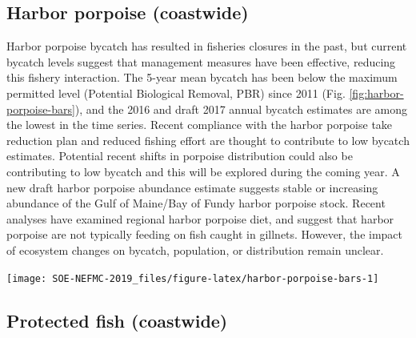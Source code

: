 \documentclass[10pt,]{article}
\let\origfigure\figure
\let\endorigfigure\endfigure
\renewenvironment{figure}[1][2] {
    \expandafter\origfigure\expandafter[H]
} {
    \endorigfigure
}
\begin{document}
\subsection{Harbor porpoise
(coastwide)}\label{harbor-porpoise-coastwide}

Harbor porpoise bycatch has resulted in fisheries closures in the past,
but current bycatch levels suggest that management measures have been
effective, reducing this fishery interaction. The 5-year mean bycatch
has been below the maximum permitted level (Potential Biological
Removal, PBR) since 2011 (Fig. \ref{fig:harbor-porpoise-bars}), and the
2016 and draft 2017 annual bycatch estimates are among the lowest in the
time series. Recent compliance with the harbor porpoise take reduction
plan and reduced fishing effort are thought to contribute to low bycatch
estimates. Potential recent shifts in porpoise distribution could also
be contributing to low bycatch and this will be explored during the
coming year. A new draft harbor porpoise abundance estimate suggests
stable or increasing abundance of the Gulf of Maine/Bay of Fundy harbor
porpoise stock. Recent analyses have examined regional harbor porpoise
diet, and suggest that harbor porpoise are not typically feeding on fish
caught in gillnets. However, the impact of ecosystem changes on bycatch,
population, or distribution remain unclear.

\begin{figure}

{\centering \texttt{[image: SOE-NEFMC-2019\_files/figure-latex/harbor-porpoise-bars-1]} 

}

\caption{Harbor porpoise bycatch estimate (black) shown with Potential Biological Removal (red). Error bars indicate 95\% confidence interval.}\label{fig:harbor-porpoise-bars}
\end{figure}

\subsection{Protected fish (coastwide)}\label{protected-fish-coastwide}
\end{document}
